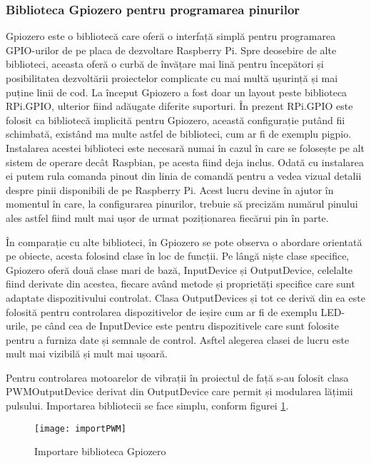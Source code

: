 \documentclass[../IoMusT.tex]{subfiles}
\begin{document}
\subsubsection{Biblioteca Gpiozero pentru programarea pinurilor}
Gpiozero este o bibliotecă care oferă o interfață simplă pentru programarea GPIO-urilor de pe placa de dezvoltare Raspberry Pi. Spre deosebire de alte biblioteci, aceasta oferă o curbă de învățare mai lină pentru începători și posibilitatea dezvoltării proiectelor complicate cu mai multă ușurință și mai puține linii de cod. La început Gpiozero a fost doar un layout peste biblioteca RPi.GPIO, ulterior fiind adăugate diferite suporturi. În prezent RPi.GPIO este folosit ca bibliotecă implicită pentru Gpiozero, această configurație putând fii schimbată, existând ma multe astfel de biblioteci, cum ar fi de exemplu pigpio. Instalarea acestei biblioteci este necesară numai în cazul în care se folosește pe alt sistem de operare decât Raspbian, pe acesta fiind deja inclus. Odată cu instalarea ei putem rula comanda pinout din linia de comandă pentru a vedea vizual detalii despre pinii disponibili de pe Raspberry Pi. Acest lucru devine în ajutor în momentul în care, la configurarea pinurilor, trebuie să precizăm numărul pinului ales astfel fiind mult mai ușor de urmat poziționarea fiecărui pin în parte.
\\
\par În comparație cu alte biblioteci, în Gpiozero se pote observa o abordare orientată pe obiecte, acesta folosind clase în loc de funcții. Pe lângă niște clase specifice, Gpiozero oferă două clase mari de bază, InputDevice și OutputDevice, celelalte fiind derivate din acestea, fiecare având metode și proprietăți specifice care sunt adaptate dispozitivului controlat. Clasa OutputDevices și tot ce derivă din ea este folosită pentru controlarea dispozitivelor de ieșire cum ar fi de exemplu LED-urile, pe când cea de InputDevice este pentru dispozitivele care sunt folosite pentru a furniza date și semnale de control. Asftel alegerea clasei de lucru este mult mai vizibilă și mult mai ușoară.
\\
\par Pentru controlarea motoarelor de vibrații în proiectul de față s-au folosit clasa PWMOutputDevice derivat din OutputDevice care permit și modularea lățimii pulsului. Importarea bibliotecii se face simplu, conform figurei \ref{fig:import}.
\begin{figure}[h]
\centering
\texttt{[image: importPWM]}
\caption{Importare biblioteca Gpiozero}
\label{fig:import}
\end{figure}
\end{document}
